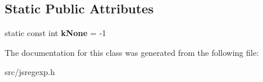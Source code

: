 \subsection*{Static Public Attributes}
\begin{DoxyCompactItemize}
\item 
\hypertarget{classv8_1_1internal_1_1_interval_a2927ae1d5748bc5d2313327d78dec69e}{}static const int {\bfseries k\+None} = -\/1\label{classv8_1_1internal_1_1_interval_a2927ae1d5748bc5d2313327d78dec69e}

\end{DoxyCompactItemize}


The documentation for this class was generated from the following file\+:\begin{DoxyCompactItemize}
\item 
src/jsregexp.\+h\end{DoxyCompactItemize}
